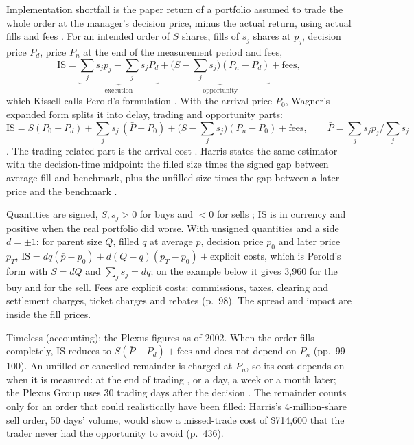 \begin{qfdefinition}\label{def:implementation-shortfall}
 Implementation shortfall is the paper return of a portfolio assumed to trade the whole order at the manager's decision price, minus the actual return, using actual fills and fees \citep[chap.~3, eqs.~(3.1)--(3.4), pp.~97--99]{s7-kissellscience}. For an intended order of $S$ shares, fills of $s_j$ shares at $p_j$, decision price $P_d$, price $P_n$ at the end of the measurement period and fees,
\[ \mathrm{IS}=\underbrace{\textstyle\sum_js_jp_j-\sum_js_jP_d}_{\text{execution}}+\underbrace{\bigl(S-\textstyle\sum_js_j\bigr)(P_n-P_d)}_{\text{opportunity}}+\text{fees}, \]
which Kissell calls Perold's formulation \citep[same chap., pp.~100--101, eq.~(3.6), p.~104]{s7-kissellscience}. With the arrival price $P_0$, Wagner's expanded form splits it into delay, trading and opportunity parts:
\[ \mathrm{IS}=S(P_0-P_d)+\textstyle\sum_js_j\,(\bar P-P_0)+\bigl(S-\sum_js_j\bigr)(P_n-P_0)+\text{fees},\qquad\bar P=\sum_js_jp_j\big/\sum_js_j \]
\citep[same chap., pp.~101--104, eq.~(3.7)]{s7-kissellscience}. The trading-related part is the arrival cost \citep[eq.~(3.9), p.~105]{s7-kissellscience}. Harris states the same estimator with the decision-time midpoint: the filled size times the signed gap between average fill and benchmark, plus the unfilled size times the gap between a later price and the benchmark \citep[chap.~``Liquidity and Transaction Cost Measurement'', p.~426]{alpha-harris}.

 Quantities are signed, $S,s_j>0$ for buys and $<0$ for sells \citep[chap.~3, eq.~(3.9), p.~105]{s7-kissellscience}; IS is in currency and positive when the real portfolio did worse. With unsigned quantities and a side $d=\pm1$: for parent size $Q$, filled $q$ at average $\bar p$, decision price $p_0$ and later price $p_T$, $\mathrm{IS}=dq(\bar p-p_0)+d(Q-q)(p_T-p_0)+\text{explicit costs}$, which is Perold's form with $S=dQ$ and $\sum_js_j=dq$; on the example below it gives 3{,}960 for the buy and for the sell. Fees are explicit costs: commissions, taxes, clearing and settlement charges, ticket charges and rebates (p.~98). The spread and impact are inside the fill prices.

 Timeless (accounting); the Plexus figures as of 2002. When the order fills completely, IS reduces to $S(\bar P-P_d)+\text{fees}$ and does not depend on $P_n$ (pp.~99--100). An unfilled or cancelled remainder is charged at $P_n$, so its cost depends on when it is measured: at the end of trading \citep[chap.~3, p.~102]{s7-kissellscience}, or a day, a week or a month later; the Plexus Group uses 30 trading days after the decision \citep[chap.~``Liquidity and Transaction Cost Measurement'', pp.~436--437]{alpha-harris}. The remainder counts only for an order that could realistically have been filled: Harris's 4-million-share sell order, 50 days' volume, would show a missed-trade cost of \$714{,}600 that the trader never had the opportunity to avoid (p.~436).


\end{qfdefinition}
